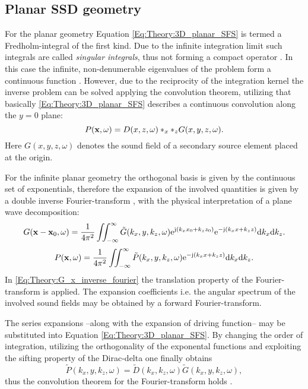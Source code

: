 \subsection{Planar SSD geometry}

For the planar geometry Equation \eqref{Eq:Theory:3D_planar_SFS} is termed a Fredholm-integral of the first kind. Due to the infinite integration limit such integrals are called \emph{singular integrals}, thus not forming a compact operator \cite[p.~921.]{MorseFeshbach1953}. 
In this case the infinite, non-denumerable eigenvalues of the problem form a continuous function \cite{MorseFeshbach1953,Schultz2014:Comparing_approaches}.
However, due to the reciprocity of the integration kernel the inverse problem can be solved applying the convolution theorem, utilizing that basically \eqref{Eq:Theory:3D_planar_SFS} describes a continuous convolution along the $y=0$ plane:
\begin{equation}
P(\mathbf{x},\omega) = D(x,z,\omega)\ast_{x} \ast_{z} G(x,y,z,\omega).
\end{equation}
Here $G(x,y,z,\omega)$ denotes the sound field of a secondary source element placed at the origin.

For the infinite planar geometry the orthogonal basis is given by the continuous set of exponentials, therefore the expansion of the involved quantities is given by a double inverse Fourier-transform \cite{Ahrens2012, Arfken2005,Schultz2014:Comparing_approaches}, with the physical interpretation of a plane wave decomposition:
\begin{equation}
G(\mathbf{x} - \mathbf{x}_0,\omega) = \frac{1}{4\pi^2} \iint_{-\infty}^{\infty} \tilde{G}(k_x,y,k_z, \omega)  \mathrm{e}^{\mathrm{j} (k_x x_0 + k_z z_0)} \mathrm{e}^{-\mathrm{j} (k_x x + k_z z)} \mathrm{d} k_x \mathrm{d} k_z.
\label{Eq:Theory:G_x_inverse_fourier}
\end{equation}
\begin{equation}
P(\mathbf{x},\omega) = \frac{1}{4\pi^2} \iint_{-\infty}^{\infty} \tilde{P}(k_x,y,k_z, \omega) \mathrm{e}^{-\mathrm{j} (k_x x + k_z z)} \mathrm{d} k_x \mathrm{d} k_z.
\end{equation}
In \eqref{Eq:Theory:G_x_inverse_fourier} the translation property of the Fourier-transform is applied.
The expansion coefficients i.e. the angular spectrum of the involved sound fields may be obtained by a forward Fourier-transform.

The series expansions --along with the expansion of driving function-- may be substituted into Equation \eqref{Eq:Theory:3D_planar_SFS}. By changing the order of integration, utilizing the orthogonality of the exponental functions and exploiting the sifting property of the Dirac-delta one finally obtains
\begin{equation}
\tilde{P}(k_x,y,k_z, \omega) = \tilde{D}(k_x,k_z, \omega)  \tilde{G}(k_x,y,k_z, \omega),
\end{equation}
thus the convolution theorem for the Fourier-transform holds \cite{Girod2001}.

